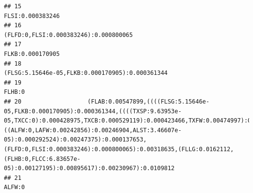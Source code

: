 \documentclass[]{article}
\begin{document}
\begin{verbatim}
## 15                                                                                                                                                                                                                                                                                                                                                                                                               FLSI:0.000383246
## 16                                                                                                                                                                                                                                                                                                                                                                                          (FLFD:0,FLSI:0.000383246):0.000800065
## 17                                                                                                                                                                                                                                                                                                                                                                                                               FLKB:0.000170905
## 18                                                                                                                                                                                                                                                                                                                                                                                (FLSG:5.15646e-05,FLKB:0.000170905):0.000361344
## 19                                                                                                                                                                                                                                                                                                                                                                                                                         FLHB:0
## 20                   (FLAB:0.00547899,((((FLSG:5.15646e-05,FLKB:0.000170905):0.000361344,((((TXSP:9.63953e-05,TXCC:0):0.000428975,TXCB:0.000529119):0.000423466,TXFW:0.00474997):0.00280452,((ALFW:0,LAFW:0.00242856):0.00246904,ALST:3.46607e-05):0.000292524):0.00247375):0.000137653,(FLFD:0,FLSI:0.000383246):0.000800065):0.00318635,(FLLG:0.0162112,(FLHB:0,FLCC:6.83657e-05):0.00127195):0.00895617):0.00230967):0.0109812
## 21                                                                                                                                                                                                                                                                                                                                                                                                                         ALFW:0

\end{verbatim}
\end{document}
